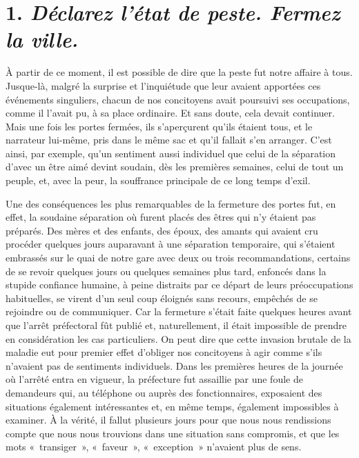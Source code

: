 \documentclass[french,twoside]{book} %
\begin{document}
\section[{1. Déclarez l’état de peste. Fermez la ville.}]{1. \emph{Déclarez l’état de peste. Fermez la ville.}}
\noindent À partir de ce moment, il est possible de dire que la peste fut notre affaire à tous. Jusque-là, malgré la surprise et l’inquiétude que leur avaient apportées ces événements singuliers, chacun de nos concitoyens avait poursuivi ses occupations, comme il l’avait pu, à sa place ordinaire. Et sans doute, cela devait continuer. Mais une fois les portes fermées, ils s’aperçurent qu’ils étaient tous, et le narrateur lui-même, pris dans le même sac et qu’il fallait s’en arranger. C’est ainsi, par exemple, qu’un sentiment aussi individuel que celui de la séparation d’avec un être aimé devint soudain, dès les premières semaines, celui de tout un peuple, et, avec la peur, la souffrance principale de ce long temps d’exil.\par
Une des conséquences les plus remarquables de la fermeture des portes fut, en effet, la soudaine séparation où furent placés des êtres qui n’y étaient pas préparés. Des mères et des enfants, des époux, des amants qui avaient cru procéder quelques jours auparavant à une séparation temporaire, qui s’étaient embrassés sur le quai de notre gare avec deux ou trois recommandations, certains de se revoir quelques jours ou quelques semaines plus tard, enfoncés dans la stupide confiance humaine, à peine distraits par ce départ de leurs préoccupations habituelles, se virent d’un seul coup éloignés sans recours, empêchés de se rejoindre ou de communiquer. Car la fermeture s’était faite quelques heures avant que l’arrêt préfectoral fût publié et, naturellement, il était impossible de prendre en considération les cas particuliers. On peut dire que cette invasion brutale de la maladie eut pour premier effet d’obliger nos concitoyens à agir comme s’ils n’avaient pas de sentiments individuels. Dans les premières heures de la journée où l’arrêté entra en vigueur, la préfecture fut assaillie par une foule de demandeurs qui, au téléphone ou auprès des fonctionnaires, exposaient des situations également intéressantes et, en même temps, également impossibles à examiner. À la vérité, il fallut plusieurs jours pour que nous nous rendissions compte que nous nous trouvions dans une situation sans compromis, et que les mots « transiger », « faveur », « exception » n’avaient plus de sens.\par
\end{document}
